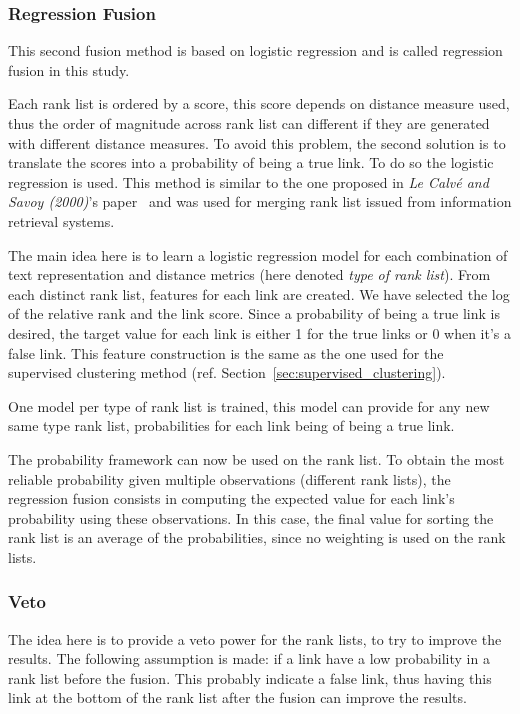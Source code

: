 \subsubsection{Regression Fusion \label{sec:regression_fusion}}

This second fusion method is based on logistic regression and is called regression fusion in this study.

Each rank list is ordered by a score, this score depends on distance measure used, thus the order of magnitude across rank list can different if they are generated with different distance measures.
To avoid this problem, the second solution is to translate the scores into a probability of being a true link.
To do so the logistic regression is used.
This method is similar to the one proposed in \textit{Le Calvé and Savoy (2000)}'s paper~\cite{le_calve_database_merging} and was used for merging rank list issued from information retrieval systems.

The main idea here is to learn a logistic regression model for each combination of text representation and distance metrics (here denoted \textit{type of rank list}).
From each distinct rank list, features for each link are created.
We have selected the log of the relative rank and the link score.
Since a probability of being a true link is desired, the target value for each link is either 1 for the true links or 0 when it's a false link.
This feature construction is the same as the one used for the supervised clustering method (ref. Section~\ref{sec:supervised_clustering}).

One model per type of rank list is trained, this model can provide for any new same type rank list, probabilities for each link being of being a true link.

The probability framework can now be used on the rank list.
To obtain the most reliable probability given multiple observations (different rank lists), the regression fusion consists in computing the expected value for each link's probability using these observations.
In this case, the final value for sorting the rank list is an average of the probabilities, since no weighting is used on the rank lists.

\subsubsection{Veto}

The idea here is to provide a veto power for the rank lists, to try to improve the results.
The following assumption is made: if a link have a low probability in a rank list before the fusion.
This probably indicate a false link, thus having this link at the bottom of the rank list after the fusion can improve the results.

